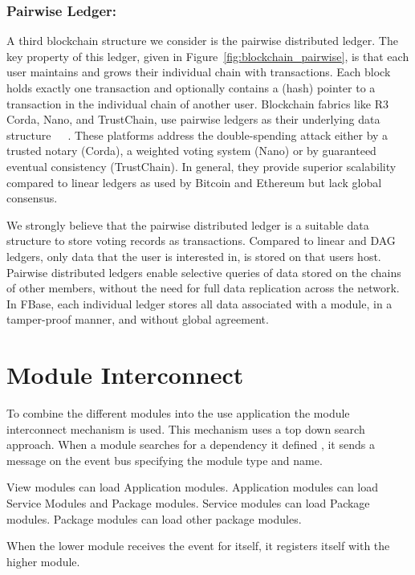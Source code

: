 \subsubsection{\textbf{Pairwise Ledger:}}
A third blockchain structure we consider is the pairwise distributed ledger.
The key property of this ledger, given in Figure~\ref{fig:blockchain_pairwise}, is that each user maintains and grows their individual chain with transactions.
Each block holds exactly one transaction and optionally contains a (hash) pointer to a transaction in the individual chain of another user.
Blockchain fabrics like R3 Corda, Nano, and TrustChain, use pairwise ledgers as their underlying data structure~\cite{otte2017trustchain}~\cite{lemahieu2017raiblocks}~\cite{brown2017introducing}.
These platforms address the double-spending attack either by a trusted notary (Corda), a weighted voting system (Nano) or by guaranteed eventual consistency (TrustChain).
In general, they provide superior scalability compared to linear ledgers as used by Bitcoin and Ethereum but lack global consensus.

We strongly believe that the pairwise distributed ledger is a suitable data structure to store voting records as transactions.
Compared to linear and DAG ledgers, only data that the user is interested in, is stored on that users host.
Pairwise distributed ledgers enable selective queries of data stored on the chains of other members, without the need for full data replication across the network.
In FBase, each individual ledger stores all data associated with a module, in a tamper-proof manner, and without global agreement.

\section{Module Interconnect}

To combine the different modules into the use application the module interconnect mechanism is used. This mechanism uses a top down search approach. When a module searches for a dependency it defined , it sends a message on the event bus specifying the module type and name.

View modules can load Application modules. Application modules can load Service Modules and Package modules. Service modules can load Package modules. Package modules can load other package modules.

When the lower module receives the event for itself, it registers itself with the higher module.

